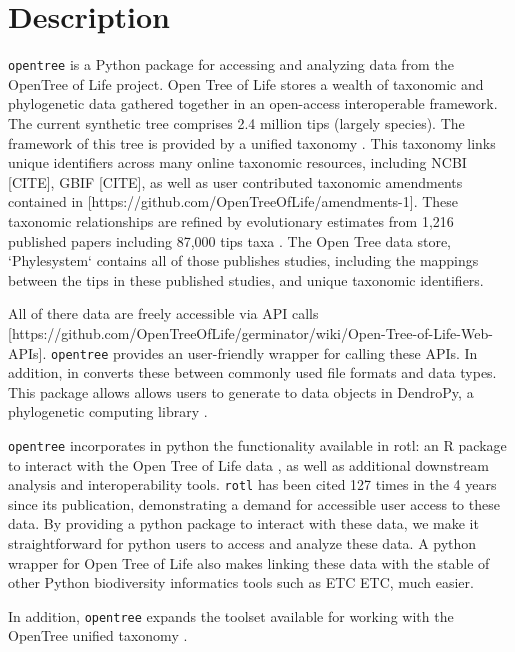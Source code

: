 \documentclass[oupdraft]{sysbio_sse}
\begin{document}
\section{Description}
\label{sec2}

\texttt{opentree} is a Python package for accessing and analyzing data from the OpenTree of Life project.
Open Tree of Life stores a wealth of taxonomic and phylogenetic data gathered together in an open-access interoperable framework.
The current synthetic tree \citep{opentreeoflife_open_2019} comprises 2.4 million tips (largely species).
The framework of this tree is provided by a unified taxonomy \citep{opentreeoflife_open_2019-1, rees_automated_2017}.
This taxonomy links unique identifiers across many online taxonomic resources, including NCBI [CITE], GBIF [CITE], as well as user contributed taxonomic amendments contained in [https://github.com/OpenTreeOfLife/amendments-1].
These taxonomic relationships are refined by evolutionary estimates from 	1,216 published papers including 87,000 tips taxa \citep{opentreeoflife_open_2019, redelings_supertree_2017}.
The Open Tree data store, `Phylesystem` \citep{mctavish_phylesystem:_2015} contains all of those publishes studies, including the mappings between the tips in these published studies, and unique taxonomic identifiers.

All of there data are freely accessible via API calls [https://github.com/OpenTreeOfLife/germinator/wiki/Open-Tree-of-Life-Web-APIs].
\texttt{opentree}  provides an user-friendly wrapper for calling these APIs.
In addition, in converts these between commonly used file formats and data types.
This package allows allows users to generate to data objects in DendroPy, a phylogenetic computing library \citep{sukumaran_dendropy_2010}.


\texttt{opentree} incorporates in python the functionality available in rotl: an {R} package to interact with the Open Tree of Life data \citep{michonneau_rotl:_2016}, as well as additional downstream analysis and interoperability tools.
\texttt{rotl}  has been cited 127 times in the 4 years since its publication, demonstrating a demand for accessible user access to these data.
By providing a python package to interact with these data, we make it straightforward for python users to access and analyze these data.
A python wrapper for Open Tree of Life also makes linking these data with the stable of other Python biodiversity informatics tools such as ETC ETC, much easier.

In addition, \texttt{opentree} expands the toolset available for working with the OpenTree unified taxonomy \citep{rees_automated_2017}.
\end{document}

